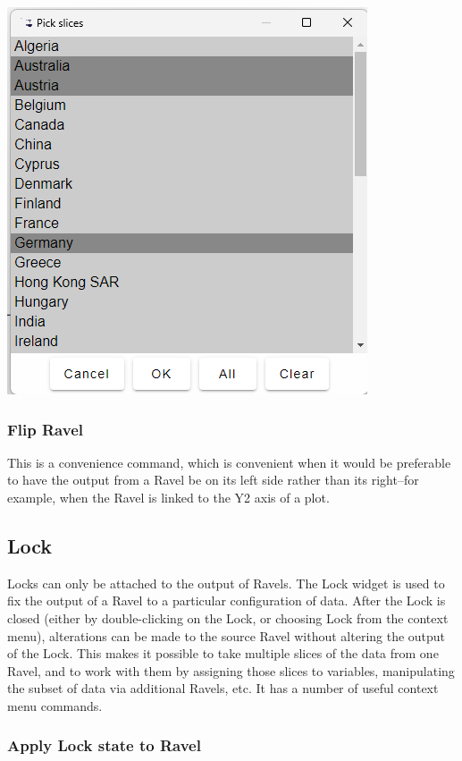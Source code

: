 \includegraphics{images/PickSlices}

\subsubsection{Flip Ravel}

This is a convenience command, which is convenient when it would be
preferable to have the output from a Ravel be on its left side rather
than its right--for example, when the Ravel is linked to the Y2 axis
of a plot.

\subsection{Lock}

\label{Lock}


Locks can only be attached to the output of Ravels. The Lock widget
is used to fix the output of a Ravel to a particular configuration
of data. After the Lock is closed (either by double-clicking on the
Lock, or choosing Lock from the context menu), alterations can be
made to the source Ravel without altering the output of the Lock.
This makes it possible to take multiple slices of the data from one
Ravel, and to work with them by assigning those slices to variables,
manipulating the subset of data via additional Ravels, etc. It has
a number of useful context menu commands.

\subsubsection{Apply Lock state to Ravel}

